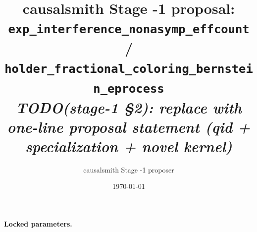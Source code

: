 \documentclass[11pt]{article}
\title{causalsmith Stage -1 proposal: \texttt{exp\_interference\_nonasymp\_effcount} / \texttt{holder\_fractional\_coloring\_bernstein\_eprocess}%
  \\ \large\textit{TODO(stage-1 \S2): replace with one-line proposal statement (qid + specialization + novel kernel)}}
\author{causalsmith Stage -1 proposer}
\date{\today}
\theoremstyle{definition}
\theoremstyle{plain}
\theoremstyle{remark}
\begin{document}
\maketitle


\paragraph{Locked parameters.}

\begin{abstract}
\end{abstract}
\end{document}
